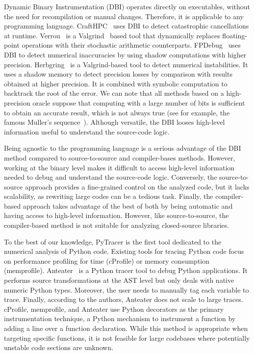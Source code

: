 \documentclass[11pt]{article}
\newcommand{\gkmod}[2]{\color{purple}\sout{#1} #2\color{black}\xspace}
\newcommand{\pytracer}[0]{PyTracer\xspace}
\begin{document}
Dynamic Binary Instrumentation (DBI) operates directly on executables, without the need for recompilation or manual changes. Therefore, it is applicable to any programming language.
CraftHPC~\cite{lam2013dynamic} uses DBI to detect catastrophic cancellations at runtime.
Verrou~\cite{fevotte2016verrou} is a Valgrind~\cite{nethercote2007valgrind} based tool that dynamically replaces
floating-point operations with their stochastic arithmetic counterparts. FPDebug~\cite{benz2012dynamic} uses DBI to detect numerical inaccuracies by using shadow computations with higher precision.
Herbgring~\cite{sanchez2017finding} is a Valgrind-based tool to detect
numerical instabilities. It uses a shadow memory to detect precision losses by comparison with results obtained at higher precision. It is combined with symbolic computation to backtrack the root of the error.
We can note that all methods based on a high-precision oracle suppose that computing with a large number of bits is sufficient to obtain an accurate result, which is not always true (see for example, the famous Muller's sequence~\cite{bajard1996introduction}). 
Although versatile, the DBI looses high-level information useful to understand the source-code logic.

Being agnostic to the programming language is a serious advantage of the DBI method compared to source-to-source and compiler-bases methods. However, working at the binary level makes it difficult to access high-level information needed to debug and understand the source-code logic. Conversely, the source-to-source approach provides a fine-grained control on the analyzed code, but it lacks scalability, as rewriting large codes can be a tedious task. Finally, the compiler-based approach takes advantage of the best of both by being automatic and having access to high-level information. However, like source-to-source, the compiler-based method is not suitable for analyzing closed-source libraries.

To the best of our knowledge, \pytracer is the first tool dedicated to the numerical analysis of Python code. Existing tools for tracing Python code focus on performance profiling for time (cProfile) 
or memory consumption (memprofile). 
Anteater~\cite{faust2019anteater} is a Python tracer tool to debug Python applications. 
It performs source transformations at the AST level but only deals with native numeric Python types.
Moreover, the user needs to manually tag each variable to trace. Finally, according to the authors, Anteater does not scale to large traces.
cProfile, memprofile, and Anteater use Python decorators as the primary instrumentation technique, a Python mechanism to instrument a function by adding a line over a function declaration.
While this method is appropriate when targeting specific functions, it is not feasible for large codebases where potentially unstable code sections are unknown.
\end{document}
